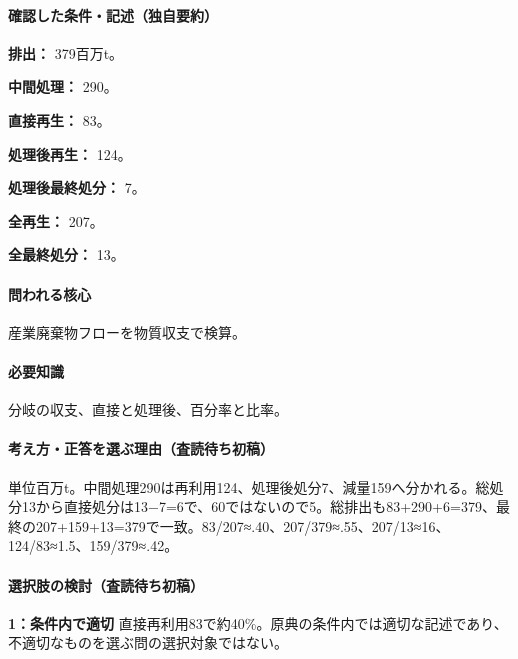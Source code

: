 \paragraph{確認した条件・記述（独自要約）}\mbox{}\par

\noindent\textbf{排出：} 379百万t。\par

\noindent\textbf{中間処理：} 290。\par

\noindent\textbf{直接再生：} 83。\par

\noindent\textbf{処理後再生：} 124。\par

\noindent\textbf{処理後最終処分：} 7。\par

\noindent\textbf{全再生：} 207。\par

\noindent\textbf{全最終処分：} 13。\par

\paragraph{問われる核心} 産業廃棄物フローを物質収支で検算。

\paragraph{必要知識} 分岐の収支、直接と処理後、百分率と比率。

\paragraph{考え方・正答を選ぶ理由（査読待ち初稿）} 単位百万t。中間処理290は再利用124、処理後処分7、減量159へ分かれる。総処分13から直接処分は13−7=\allowbreak{}6で、60ではないので5。総排出も83+290+6=\allowbreak{}379、最終の207+159+13=\allowbreak{}379で一致。83/207≈.40、207/379≈.55、207/13≈16、124/83≈1.5、159/379≈.42。

\paragraph{選択肢の検討（査読待ち初稿）}\mbox{}\par

\noindent\textbf{1：条件内で適切} 直接再利用83で約40\%。原典の条件内では適切な記述であり、不適切なものを選ぶ問の選択対象ではない。\par

